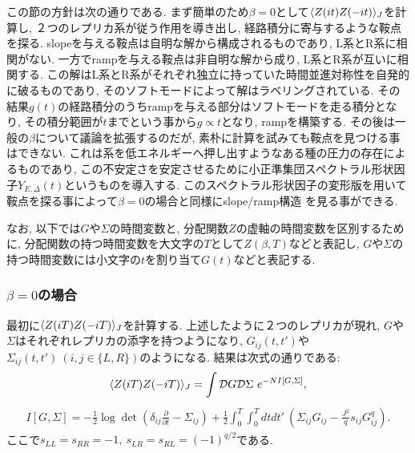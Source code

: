 この節の方針は次の通りである. 
まず簡単のため$\beta=0$として$\langle Z(it)Z(-it) \rangle_J$を計算し, 
２つのレプリカ系が従う作用を導き出し, 経路積分に寄与するような鞍点を探る. 
slopeを与える鞍点は自明な解から構成されるものであり, L系とR系に相関がない. 
一方でrampを与える鞍点は非自明な解から成り, L系とR系が互いに相関する. 
この解はL系とR系がそれぞれ独立に持っていた時間並進対称性を自発的に破るものであり, 
そのソフトモードによって解はラベリングされている. 
その結果$g(t)$の経路積分のうちrampを与える部分はソフトモードを走る積分となり, 
その積分範囲が$t$までという事から$g \propto t$となり, rampを構築する. 
その後は一般の$\beta$について議論を拡張するのだが, 素朴に計算を試みても鞍点を見つける事はできない. 
これは系を低エネルギーへ押し出すようなある種の圧力の存在によるものであり, 
この不安定さを安定させるために小正準集団スペクトラル形状因子$Y_{E,\Delta}(t)$というものを導入する. 
このスペクトラル形状因子の変形版を用いて鞍点を探る事によって$\beta = 0$の場合と同様にslope/ramp構造
を見る事ができる. 

なお, 以下では$G$や$\Sigma$の時間変数と, 分配関数$Z$の虚軸の時間変数を区別するために, 
分配関数の持つ時間変数を大文字の$T$として$Z(\beta, T)$などと表記し, 
$G$や$\Sigma$の持つ時間変数には小文字の$t$を割り当て$G(t)$などと表記する. 

\subsubsection{$\beta = 0$の場合}
最初に$\langle Z(iT)Z(-iT) \rangle_J$を計算する. 
上述したように２つのレプリカが現れ, $G$や$\Sigma$はそれぞれレプリカの添字を持つようになり, 
$G_{ij}(t,t')$や$\Sigma_{ij}(t,t')\ (i,j \in \{L, R\})$のようになる. 
結果は次式の通りである:
\begin{align}
	\langle Z(iT)Z(-iT) \rangle_J
	= \int \mathcal{D}G\mathcal{D}\Sigma\ e^{-NI[G, \Sigma]},
\end{align}
\begin{align}
	I[G, \Sigma]
	= -\frac{1}{2}\log \det\left(
			\delta_{ij}\frac{\partial}{\partial t} - \Sigma_{ij}
		\right) + \frac{1}{2}\int_0^T\int_0^T dtdt'\ \left(
			\Sigma_{ij}G_{ij} - \frac{J^2}{q}s_{ij}G_{ij}^q
		\right).
	\label{eq:action_for_the_two_replicas}
\end{align}
ここで$s_{LL} = s_{RR} = -1,\ s_{LR} = s_{RL} = (-1)^{q/2}$である. 

